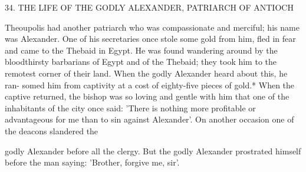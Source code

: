 34. THE LIFE OF THE GODLY ALEXANDER,
PATRIARCH OF ANTIOCH

Theoupolis had another patriarch who was compassionate and
merciful; his name was Alexander. One of his secretaries once stole
some gold from him, fled in fear and came to the Thebaid in Egypt.
He was found wandering around by the bloodthirsty barbarians of
Egypt and of the Thebaid; they took him to the remotest corner of
their land. When the godly Alexander heard about this, he ran-
somed him from captivity at a cost of eighty-five pieces of gold.*
When the captive returned, the bishop was so loving and gentle with
him that one of the inhabitants of the city once said: 'There is
nothing more profitable or advantageous for me than to sin against
Alexander'. On another occasion one of the deacons slandered the

godly Alexander before all the clergy. But the godly Alexander
prostrated himself before the man saying: 'Brother, forgive me, sir'.

